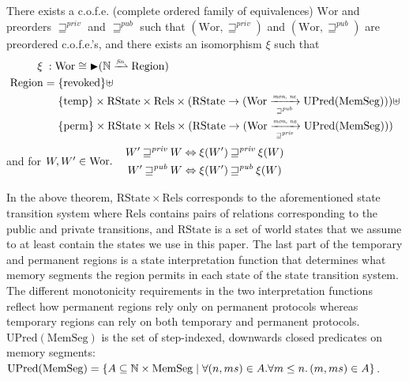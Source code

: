 \documentclass[format=acmsmall, review=true, screen=true]{acmart}
\newcommand{\finparfun}{\xrightharpoonup{\textit{\tiny{fin}}}}
\newcommand{\fun}{\rightarrow}
\newcommand{\blater}{\mathop{\blacktriangleright}}
\newcommand{\cofe}{c.o.f.e.}
\newcommand{\cofes}{\cofe{}'s}
\newcommand\lau[1]{{\color{purple} \sf \footnotesize {LS: #1}}\\}
\newcommand\dominique[1]{{\color{purple} \sf \footnotesize {DD: #1}}\\}
\renewcommand\lau[1]{}
\renewcommand\dominique[1]{}
\newcommand{\var}[1]{\mathit{#1}}
\newcommand{\futurewk}{\mathbin{\sqsupseteq}^{\var{pub}}}
\newcommand{\futurestr}{\mathbin{\sqsupseteq}^{\var{priv}}}
\newcommand{\monwknefun}{\xrightarrow[\text{\tiny{$\futurewk$}}]{\textit{\tiny{mon, ne}}}}
\newcommand{\monstrnefun}{\xrightarrow[\text{\tiny{$\futurestr$}}]{\textit{\tiny{mon, ne}}}}
\newcommand{\plaindom}[1]{\mathrm{#1}}
\newcommand{\HeapSegments}{\plaindom{MemSeg}}
\newcommand{\nats}{\mathbb{N}}
\newcommand{\Rels}{\plaindom{Rels}}
\newcommand{\States}{\plaindom{RState}}
\newcommand{\Regions}{\plaindom{Region}}
\newcommand{\Wor}{\plaindom{Wor}}
\newcommand{\UPred}[1]{\plaindom{UPred}(#1)}
\newcommand{\plainview}[1]{\mathrm{#1}}
\newcommand{\perma}{\plainview{perm}}
\newcommand{\temp}{\plainview{temp}}
\newcommand{\revoked}{\plainview{revoked}}
\begin{document}
\begin{theorem}\label{thm:world-existence}
  There exists a \cofe{} (complete ordered family of equivalences) $\Wor$ and preorders $\futurestr$ and
  $\futurewk$ such that $(\Wor,\futurestr)$ and $(\Wor,\futurewk)$ are
  preordered \cofes{}, and there exists an isomorphism $\xi$ such that
  \begin{align*}
      \xi \; : \; & \Wor \cong \blater (\nats \finparfun \Regions)\\
      \Regions  = & \; \{\revoked\} \uplus \\
               & \; \{\temp\} \times \States \times \Rels \times (\States \fun (\Wor \monwknefun \UPred{\HeapSegments}))\uplus \\
               & \; \{\perma\} \times \States \times \Rels \times (\States \fun (\Wor \monstrnefun \UPred{\HeapSegments}))
    \end{align*}
  and for $W, W' \in \Wor\ldotp \quad  
  \begin{aligned}
    W' \futurestr W & \Leftrightarrow \xi(W') \futurestr \xi(W)   \\
    W' \futurewk W & \Leftrightarrow \xi(W') \futurewk \xi(W)
  \end{aligned}$
\end{theorem}
In the above theorem, $\States \times \Rels$ corresponds to the aforementioned
state transition system where $\Rels$ contains pairs of relations corresponding
to the public and private transitions, and $\States$ is a set of world states that
we assume to at least contain the states we use in this paper. The last part of
the temporary and permanent regions is a state interpretation function that
determines what memory segments the region permits in each state of the state
transition system.  The different monotonicity requirements in the two
interpretation functions reflect how permanent regions rely only on permanent
protocols whereas temporary regions can rely on both temporary and permanent
protocols.  $\UPred{\HeapSegments}$ is the set of step-indexed, downwards closed
predicates on memory segments:
$\UPred{\HeapSegments} = \{ A \subseteq  \nats \times
\HeapSegments \mid 
\forall (n, ms) \in A. \forall m
\leq n\ldotp (m, ms) \in A\}$. 
\
\end{document}

